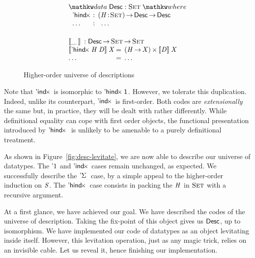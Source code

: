 \begin{figure}

\[\stk{
\begin{array}{ll}
\stk{
\data \Desc : \Set \where \\
\;\;\begin{array}{@{}l@{\::\:\:}l@{\quad}l}
    \DHindx{\!}{\!} & \PI{\V{H}}{\Set} \Desc \To \Desc \\
    \ldots          & \:\:\ldots
\end{array}
}
\vspace{0.2in}
\\
\stk{
\descop{\_\:}{} : \Desc \To \Set \To \Set \\
\begin{array}{@{}l@{\:=\:\:}ll}
\descop{\DHindx{\V{H}}{\V{D}}}{\V{X}}     &  \TIMES{(\V{H} \To \V{X})}{\descop{\V{D}}{\V{X}}} \\
\ldots                                    &  \ldots 
\end{array}
}
\end{array}
}\]

\caption{Higher-order universe of descriptions}
\label{fig:hindx_desc}

\end{figure}


Note that $\DIndx{\!}$ is isomorphic to $\DHindx{\Unit}{\!}$. However,
we tolerate this duplication. Indeed, unlike its counterpart,
$\DIndx{\!}$ is first-order. Both codes are \emph{extensionally} the
same but, in practice, they will be dealt with rather
differently. While definitional equality can cope with first order
objects, the functional presentation introduced by $\DHindx{\!}{}$ is
unlikely to be amenable to a purely definitional treatment.

As shown in Figure~\ref{fig:desc-levitate}, we are now able to
describe our universe of datatypes.  The $\DUnit$ and $\DIndx{\!}$
cases remain unchanged, as expected. We successfully describe the
$\DSigma{\!}{}$ case, by a simple appeal to the higher-order induction
on $\V{S}$. The $\DHindx{\!}{\!}$ case consists in packing the $\V{H}$
in $\Set$ with a recursive argument.

At a first glance, we have achieved our goal. We have described the
codes of the universe of description. Taking the fix-point of this
object gives us $\Desc$, up to isomorphism. We have implemented our
code of datatypes as an object levitating inside itself. However,
this levitation operation, just as any magic trick, relies on an
invisible cable. Let us reveal it, hence finishing our implementation.

